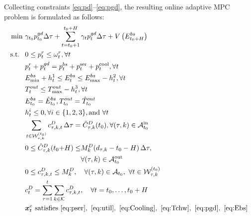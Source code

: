 \documentclass[a4paper,fleqn]{cas-dc}
\theoremstyle{plain}
\theoremstyle{remark}
\theoremstyle{plain}
\begin{document}
Collecting constraints \eqref{eq:pd}--\eqref{eq:pgd}, the resulting online adaptive MPC problem is formulated as follows:
\begin{subequations}\label{eq:total_problem}
\begin{align}
    \min\ & \gamma_{t_0}p_{t_0}^{gd}\Delta \tau + \sum_{t=t_0+1}^{t_0+H}\gamma_t p_t^{gd} \Delta \tau
           + V\left(E_{t_0+H}^{bs}\right) 
           \label{eq:total_problem_obj} \\
    \text{s.t. }\ &
    0 \leq p_{t}^r \leq \omega_{t}^r ,\forall t  \\
    &
    p_t^r + p_t^{gd}
    = p_t^{bs} + p_t^{\text{ser}} + p_t^{\text{cool}},
    \forall t
    \label{eq:total_problem_balance} \\
    &
    E_{\min}^{bs} + h_t^1 \leq E_t^{bs}
    \leq E_{\max}^{bs} - h_t^2,
    \forall t
    \label{eq:total_problem_E_bounds} \\
    &
    T_t^{out} \leq T_{\max}^{out} - h_t^3,
    \forall t
    \label{eq:total_problem_T_out_bound} \\
    & E_{t_0}^{bs} = \hat{E}_{t_0}^{bs}, T_{t_0}^{out} = \hat{T}_{t_0}^{out} \label{eq:total_problem_init} \\
    &
    h_t^i \le 0,
    \forall i\in\{1,2,3\},\text{and } \forall t
    \label{eq:total_problem_h} \\
    & \sum_{t\in \mathcal{W}_{\tau,k}^{(t_0)}} c_{\tau,k,t}^D \,\Delta \tau
    = \hat{C}_{\tau,k}^D(t_0),
     \forall (\tau,k)\in\mathcal{A}_{t_0}^{\mathrm{in}}
    \label{eq:total_problem_sumC}\\
    & \begin{aligned}[t]
    0 \le \hat{C}_{\tau,k}^D(t_0{+}H) \le& M_k^D\!\left(d_{\tau,k}-t_0-H\right)\Delta\tau,\\
      & \forall (\tau,k)\in\mathcal{A}_{t_0}^{\mathrm{out}}
    \end{aligned}\\
    & 0 \le c_{\tau,k,t}^D \le M_k^D,
    \quad \forall (\tau,k)\in\mathcal{A}_{t_0},\ \forall t\in \mathcal{W}_{\tau,k}^{(t_0)}\\
    & c_t^{D} = \sum_{\tau=1}^{t}\sum_{k\in\mathcal{K}} c_{\tau,k,t}^D,\quad \forall t=t_0,\ldots,t_0+H
    \label{eq:total_problem_agg}\\
    & \boldsymbol{x}_t^e \text{ satisfies } \eqref{eq:pser},\ \eqref{eq:util},\ \eqref{eq:Cooling},\ \eqref{eq:Tchw},\ \eqref{eq:pgd},\ \eqref{eq:Ebs} 
\end{align}
\end{subequations}
\end{document}
